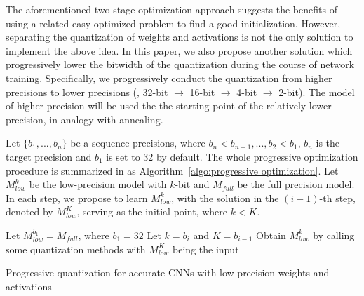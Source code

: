 \documentclass[10pt,twocolumn,letterpaper]{article}
\begin{document}
%

The aforementioned two-stage optimization approach suggests the benefits of using a related easy optimized problem to find a good initialization. However, separating the quantization of weights and activations is not the only solution to implement the above idea. In this paper, we also propose another solution which progressively lower the bitwidth of the quantization during the course of network training.
Specifically, we progressively conduct the quantization from higher precisions to lower precisions (\eg, 32-bit $\to$ 16-bit $\to$ 4-bit $\to$ 2-bit). The model of higher precision will be used the the starting point of the relatively lower precision, in analogy with annealing.


Let $\{{b_1},...,{b_n}\}$ be a  sequence precisions, where  $b_n<b_{n-1}, ..., b_2<{b_1}$, $b_n$ is the target precision and $b_1$ is set to 32 by default. The whole progressive optimization procedure  is summarized in as Algorithm~\ref{algo:progressive optimization}.
%
 Let $M_{low}^{k}$ be the low-precision model with $k$-bit and $M_{full}$ be the full precision model. In each step, we propose to learn $M_{low}^{k}$, with the solution in the $(i-1)$-th step, denoted by $M_{low}^{K}$, serving as the initial point, where $k<K$.
%

%
%
%



%

%


%

%

%

%
\begin{algorithm}[]
	Let $M_{low}^{b_1}=M_{full}$, where $b_1 = 32$\;
	{
		Let $k = b_i$ and $K=b_{i-1}$\;
		Obtain $M_{low}^{k}$ by calling some quantization methods with $M_{low}^{K}$  being the input\;
	}
	\caption{Progressive quantization for accurate CNNs with low-precision weights and activations}
	\label{algo:progressive optimization}
\end{algorithm}


%


%


%
\end{document}
